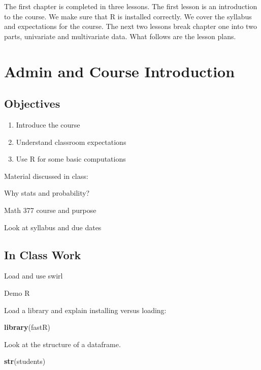 \documentclass[]{book}
\newenvironment{Shaded}{\begin{snugshade}}{\end{snugshade}}
\newcommand{\KeywordTok}[1]{\textcolor[rgb]{0.13,0.29,0.53}{\textbf{#1}}}
\newcommand{\NormalTok}[1]{#1}
\providecommand{\tightlist}{%
  \setlength{\itemsep}{0pt}\setlength{\parskip}{0pt}}
\theoremstyle{definition}
\theoremstyle{definition}
\theoremstyle{definition}
\theoremstyle{remark}
\begin{document}
The first chapter is completed in three lessons. The first lesson is an
introduction to the course. We make sure that R is installed correctly.
We cover the syllabus and expectations for the course. The next two
lessons break chapter one into two parts, univariate and multivariate
data. What follows are the lesson plans.

\hypertarget{L1}{\section{Admin and Course Introduction}\label{L1}}

\subsection{Objectives}\label{objectives}

\begin{enumerate}
\def\labelenumi{\arabic{enumi}.}
\tightlist
\item
  Introduce the course\\
\item
  Understand classroom expectations\\
\item
  Use R for some basic computations
\end{enumerate}

Material discussed in class:

Why stats and probability?

Math 377 course and purpose

Look at syllabus and due dates

\subsection{In Class Work}\label{in-class-work}

Load and use swirl

Demo R

Load a library and explain installing versus loading:

\begin{Shaded}
\begin{Highlighting}[]
\KeywordTok{library}\NormalTok{(fastR)}
\end{Highlighting}
\end{Shaded}

Look at the structure of a dataframe.

\begin{Shaded}
\begin{Highlighting}[]
\KeywordTok{str}\NormalTok{(students)}
\end{Highlighting}
\end{Shaded}
\end{document}
